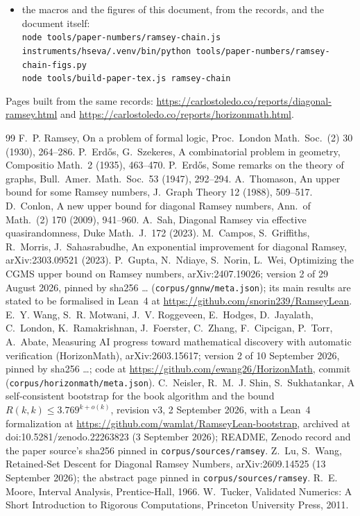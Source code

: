 \documentclass[11pt]{article}
\begin{document}
{\begin{itemize}
\item the macros and the figures of this document, from the records, and the document itself:\\ {\small\texttt{node tools/paper-numbers/ramsey-chain.js}}\\ {\small\texttt{instruments/hseva/.venv/bin/python tools/paper-numbers/ramsey-chain-figs.py}}\\ {\small\texttt{node tools/build-paper-tex.js ramsey-chain}}
\end{itemize}
Pages built from the same records: {\small\url{https://carlostoledo.co/reports/diagonal-ramsey.html}} and {\small\url{https://carlostoledo.co/reports/horizonmath.html}}.}

\begin{thebibliography}{99}\small
{} F.~P. Ramsey, On a problem of formal logic, Proc.\ London Math.\ Soc.\ (2) 30 (1930), 264--286.
 P.~Erd\H{o}s, G.~Szekeres, A combinatorial problem in geometry, Compositio Math.\ 2 (1935), 463--470.
 P.~Erd\H{o}s, Some remarks on the theory of graphs, Bull.\ Amer.\ Math.\ Soc.\ 53 (1947), 292--294.
 A.~Thomason, An upper bound for some Ramsey numbers, J.\ Graph Theory 12 (1988), 509--517.
 D.~Conlon, A new upper bound for diagonal Ramsey numbers, Ann.\ of Math.\ (2) 170 (2009), 941--960.
 A.~Sah, Diagonal Ramsey via effective quasirandomness, Duke Math.\ J.\ 172 (2023).
 M.~Campos, S.~Griffiths, R.~Morris, J.~Sahasrabudhe, An exponential improvement for diagonal Ramsey, arXiv:2303.09521 (2023).
 P.~Gupta, N.~Ndiaye, S.~Norin, L.~Wei, Optimizing the CGMS upper bound on Ramsey numbers, arXiv:2407.19026; version 2 of 29 August 2026, pinned by sha256 \GnnwSha\ldots{} (\texttt{corpus/gnnw/meta.json}); its main results are stated to be formalised in Lean~4 at \url{https://github.com/snorin239/RamseyLean}.
 E.~Y. Wang, S.~R. Motwani, J.~V. Roggeveen, E.~Hodges, D.~Jayalath, C.~London, K.~Ramakrishnan, J.~Foerster, C.~Zhang, F.~Cipcigan, P.~Torr, A.~Abate, Measuring AI progress toward mathematical discovery with automatic verification (HorizonMath), arXiv:2603.15617; version 2 of 10 September 2026, pinned by sha256 \HmSha\ldots; code at \url{https://github.com/ewang26/HorizonMath}, commit \HmCommit{} (\texttt{corpus/horizonmath/meta.json}).
 C.~Neisler, R.~M.~J. Shin, S.~Sukhatankar, A self-consistent bootstrap for the book algorithm and the bound $R(k,k)\le3.769^{k+o(k)}$, revision v3, 2 September 2026, with a Lean~4 formalization at \url{https://github.com/wamlat/RamseyLean-bootstrap}, archived at doi:10.5281/zenodo.22263823 (3 September 2026); README, Zenodo record and the paper source's sha256 pinned in \texttt{corpus/sources/ramsey}.
 Z.~Lu, S.~Wang, Retained-Set Descent for Diagonal Ramsey Numbers, arXiv:2609.14525 (13 September 2026); the abstract page pinned in \texttt{corpus/sources/ramsey}.
 R.~E. Moore, Interval Analysis, Prentice-Hall, 1966.
 W.~Tucker, Validated Numerics: A Short Introduction to Rigorous Computations, Princeton University Press, 2011.
\end{thebibliography}
\end{document}
